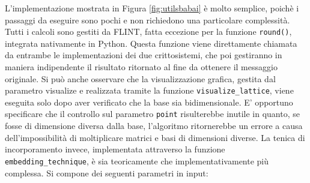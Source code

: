L'implementazione mostrata in Figura \ref{fig:utilsbabai} è molto semplice, poichè
i passaggi da eseguire sono pochi e non richiedono una particolare complessità. 
Tutti i calcoli sono gestiti da FLINT, fatta eccezione per la funzione \texttt{round()},
integrata nativamente in Python.
Questa funzione viene direttamente chiamata da entrambe le implementazioni dei due 
crittosistemi, che poi gestiranno in maniera indipendente il risultato ritornato al
fine da ottenere il messaggio originale. 
Si può anche osservare che la visualizzazione grafica, gestita dal parametro visualize 
e realizzata tramite la funzione \texttt{visualize\_lattice}, viene eseguita solo dopo 
aver verificato che la base sia bidimensionale.
E' opportuno specificare che il controllo sul parametro \texttt{point} risulterebbe inutile
in quanto, se fosse di dimensione diversa dalla base, l'algoritmo ritornerebbe un errore 
a causa dell'impossibilità di moltiplicare matrici e basi di dimensioni diverse. 
La tenica di incorporamento invece, implementata attraverso la funzione \\
\texttt{embedding\_technique}, è sia teoricamente che implementativamente più complessa. 
Si compone dei seguenti parametri in input:
